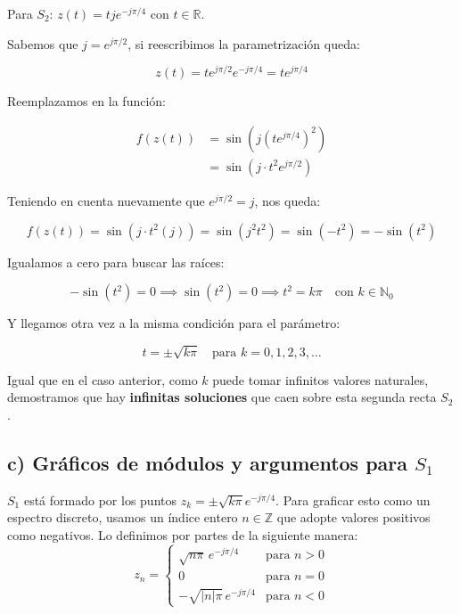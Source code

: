 \documentclass[a4paper, 12pt]{article}
\begin{document}
\vspace{0.4cm}

Para $S_2$: \qquad $z(t) = tje^{-j\pi/4}$ con $t \in \mathbb{R}$.

\vspace{0.4cm}

Sabemos que $j = e^{j\pi/2}$, si reescribimos la parametrización queda:

\[
z(t) = te^{j\pi/2} e^{-j\pi/4} = te^{j\pi/4}
\]

Reemplazamos en la función:

\begin{align*}
f(z(t)) &= \sin\left(j(te^{j\pi/4})^2\right) \\
&= \sin\left(j \cdot t^2 e^{j\pi/2}\right)
\end{align*}

Teniendo en cuenta nuevamente que $e^{j\pi/2} = j$, nos queda:

\[
f(z(t)) = \sin\left(j \cdot t^2(j)\right) = \sin(j^2t^2) = \sin(-t^2) = -\sin(t^2)
\]

Igualamos a cero para buscar las raíces:

\[
-\sin(t^2) = 0 \implies \sin(t^2) = 0 \implies t^2 = k\pi \quad \text{con } k \in \mathbb{N}_0
\]

Y llegamos otra vez a la misma condición para el parámetro:

\[
t = \pm\sqrt{k\pi} \quad \text{para } k = 0, 1, 2, 3, \dots
\]

Igual que en el caso anterior, como $k$ puede tomar infinitos valores naturales, demostramos que hay \textbf{infinitas soluciones} que caen sobre esta segunda recta $S_2$.



\subsection{c) Gráficos de módulos y argumentos para $S_1$}

 $S_1$ está formado por los puntos $z_k = \pm \sqrt{k\pi} e^{-j\pi/4}$. Para graficar esto como un espectro discreto, usamos un índice entero $n \in \mathbb{Z}$ que adopte valores positivos como negativos. Lo definimos por partes de la siguiente manera:
\[
z_n = \begin{cases} 
\sqrt{n\pi} \, e^{-j\pi/4} & \text{para } n > 0 \\
0 & \text{para } n = 0 \\
-\sqrt{|n|\pi} \, e^{-j\pi/4} & \text{para } n < 0 
\end{cases}
\]
\end{document}
